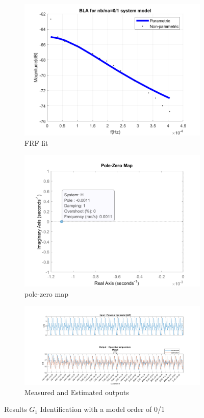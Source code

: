 \documentclass[a4paper,12pt]{article}
\numberwithin{equation}{section}
\begin{document}
\begin{figure}[H]
\centering
\begin{subfigure}{.5\textwidth}
  \centering
  \includegraphics[width=.7\linewidth]{G1mod01FrfFit.png}
  \caption{FRF fit}
  \label{fig:frf fit G1mod0/1}
\end{subfigure}%
\begin{subfigure}{.5\textwidth}
  \centering
  \includegraphics[width=.7\linewidth]{G1mod01pzmap.png}
  \caption{pole-zero map}
  \label{fig:pzmap G1mod0/1}
\end{subfigure}

\begin{subfigure}{\textwidth}
  \centering
  \includegraphics[scale=0.38]{G1mod01InOut.png}
  \caption{Measured and Estimated outputs}
  \label{fig:inoutG10/1}
\end{subfigure}
\caption{Results $G_{1}$ Identification with a model order of 0/1 }
\label{fig:G1mod0/1}
\end{figure}
\end{document}
